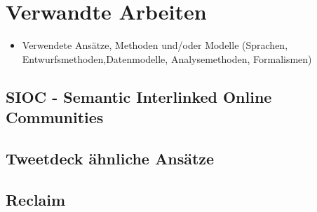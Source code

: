 
\chapter{Verwandte Arbeiten} %
\label{cha:verwandte_arbeiten}

\begin{itemize}
    \item Verwendete Ansätze, Methoden und/oder Modelle (Sprachen, Entwurfsmethoden,Datenmodelle, Analysemethoden, Formalismen)
\end{itemize}


\section{SIOC - Semantic Interlinked Online Communities} %
\label{sec:sioc}


\section{Tweetdeck ähnliche Ansätze} %
\label{sec:tweetdeck_hnliche_ans_tze}


\section{Reclaim} %
\label{sec:reclaim}



